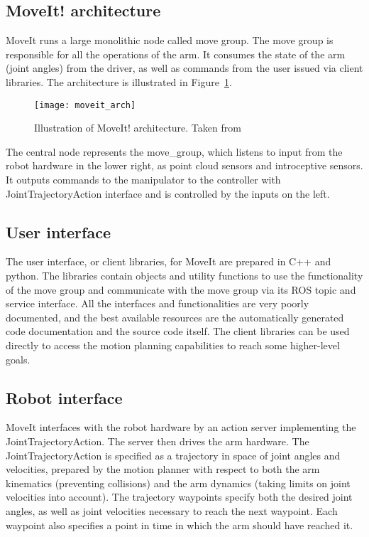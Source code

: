 \documentclass[buriama8_dp.tex]{subfiles}
\begin{document}
\subsection{MoveIt! architecture}
\label{subsec:mvt_arch}

MoveIt runs a large monolithic node called move group. The move group is responsible for all the operations of the arm. It consumes the state of the arm (joint angles) from the driver, as well as commands from the user issued via client libraries. The architecture is illustrated in Figure~\ref{fig:moveit_arch}.

\begin{figure}[ht]
  \centering
  \texttt{[image: moveit\_arch]}
  \caption[MoveIt! architecture]{Illustration of MoveIt! architecture. Taken from \cite{moveit_docs}}
  \label{fig:moveit_arch}
\end{figure}

The central node represents the move\_group, which listens to input from the robot hardware in the lower right, as point cloud sensors and introceptive sensors. It outputs commands to the manipulator to the controller with JointTrajectoryAction interface and is controlled by the inputs on the left. 

\subsection{User interface}
\label{subsec:moveit_ui}

The user interface, or client libraries, for MoveIt are prepared in C++ and python. The libraries contain objects and utility functions to use the functionality of the move group and communicate with the move group via its ROS topic and service interface. All the interfaces and functionalities are very poorly documented, and the best available resources are the automatically generated code documentation and the source code itself. The client libraries can be used directly to access the motion planning capabilities to reach some higher-level goals.


\subsection{Robot interface}
\label{subsec:moveit_ri}

MoveIt interfaces with the robot hardware by an action server implementing the JointTrajectoryAction. The server then drives the arm hardware. The JointTrajectoryAction is specified as a trajectory in space of joint angles and velocities, prepared by the motion planner with respect to both the arm kinematics (preventing collisions) and the arm dynamics (taking limits on joint velocities into account). The trajectory waypoints specify both the desired joint angles, as well as joint velocities necessary to reach the next waypoint. Each waypoint also specifies a point in time in which the arm should have reached it.
\end{document}
